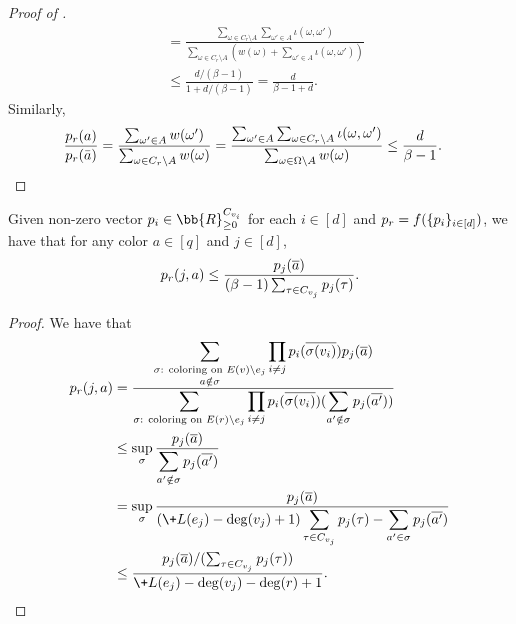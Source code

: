 \begin{proof}[Proof of ]
\begin{align*}
&= \frac{\sum_{\omega\in C_r\setminus A} \sum_{\omega'\in A} \iota(\omega, \omega')}
        {\sum_{\omega\in C_r\setminus A} \left(w(\omega) + \sum_{\omega'\in A}\iota(\omega, \omega')\right)}\\
&\le \frac{d/(\beta-1)}{1 + d/(\beta-1)} = \frac{d}{\beta-1+d}.
\end{align*}
Similarly,
\begin{align*}
\frac{\*p_r(a)}{\*p_r(\bar{a})}
&= \frac{\sum_{\omega'\in A} w(\omega')}{\sum_{\omega\in C_r\setminus A} w(\omega)}
= \frac{\sum_{\omega'\in A}\sum_{\omega\in C_r\setminus A} \iota(\omega, \omega')}
        {\sum_{\omega\in \Omega\setminus A} w(\omega)}
\le \frac{d}{\beta-1}.
\end{align*}
    \end{proof}
    
\begin{lemma}\label{lem:marginal_bound_2}
    Given non-zero vector $\*p_i\in \bb{R}_{\geq 0}^{C_{v_i}}$ for each $i\in [d]$ and $\*p_r = f(\{\*p_i\}_{i\in[d]})$, we have that for any color $a\in [q]$ and $j\in [d]$,
    $$
        \*p_r(j,a) \leq \frac{\*p_j(\overline a)}{(\beta - 1)\sum_{\tau\in C_{v_j}}\*p_j(\tau)}.
    $$
\end{lemma}
\begin{proof}
        We have that
        \begin{align*}
            \*p_r(j,a) &= \frac{\displaystyle \sum_{\substack{\sigma\text{: coloring on }E(v)\setminus e_j\\a\notin \sigma}} \prod_{i\neq j}\*p_i(\overline{\sigma(v_i)})\*p_j(\overline{a})}{\displaystyle \sum_{\sigma\text{: coloring on }E(r)\setminus e_j} \prod_{i\neq j}\*p_i(\overline{\sigma(v_i)})(\sum_{a'\notin \sigma} \*p_j(\overline{a'}))}
            \\&\leq \sup_{\sigma}\frac{\displaystyle \*p_j(\overline{a})}{\displaystyle \sum_{a'\notin \sigma} \*p_j(\overline{a'})}
            \\&= \sup_{\sigma}\frac{\displaystyle \*p_j(\overline{a})}{\displaystyle(\+L(e_j) - \deg(v_j) + 1)\sum_{\tau\in C_{v_j}}\*p_j(\tau) - \sum_{a'\in \sigma} \*p_j(\overline{a'})}
            \\&\leq \frac{\*p_j(\overline{a})/(\sum_{\tau\in C_{v_j}}\*p_j(\tau))}{\+L(e_j) - \deg(v_j) - \deg(r) + 1}.
        \end{align*}
\end{proof}
